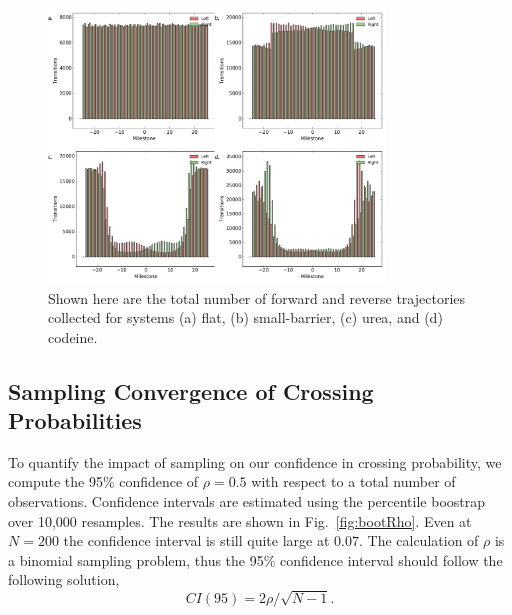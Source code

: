         \begin{figure}[!htbp]
        \begin{center}
            \includegraphics[width=0.8\textwidth]{Figures/transitions}
            \caption[Number of forward and reverse trajectories collected for each toy system]{Shown here are the total number of forward and reverse trajectories collected for systems (a) flat, (b) small-barrier, (c) urea, and (d) codeine.}
            \label{fig:transitions}
        \end{center}
        \end{figure}

    \subsection{Sampling Convergence of Crossing Probabilities}
        \par To quantify the impact of sampling on our confidence in crossing probability, we compute the 95\% confidence of $\rho=0.5$ with respect to a total number of observations. Confidence intervals are estimated using the percentile boostrap over 10,000 resamples. The results are shown in Fig.~\ref{fig:bootRho}. Even at $N=200$ the confidence interval is still quite large at $0.07$. The calculation of $\rho$ is a binomial sampling problem, thus the 95\% confidence interval should follow the following solution,
        \begin{equation}
            CI(95) = 2\rho/\sqrt{N-1}.
        \end{equation}


